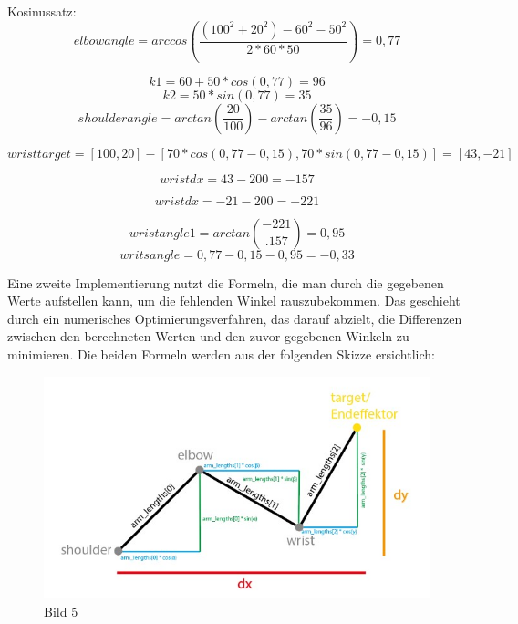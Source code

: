 \documentclass[12pt]{article}
\begin{document}
    Kosinussatz:
    \[
        elbowangle = arccos(\frac{(100^2 +20^2)-60^2-50^2}{2*60*50}) = 0,77
    \]

    

    \[
        k1 = 60 +50 * cos(0,77) = 96
    \]
    \[
        k2 = 50*sin(0,77) = 35
    \]
    \[
        shoulderangle = arctan(\frac{20}{100}) - arctan(\frac{35}{96}) = -0,15
    \]

    

    \[
        wristtarget = [100, 20] - [70 * cos(0,77 - 0,15), 70* sin(0,77 -0,15)] = [43, -21]
    \]

    \[
        wristdx = 43 - 200 = -157
    \]

    \[
        wristdx = -21 - 200 = -221
    \]

    \[
        wristangle1 = arctan(\frac{-221}{.157})= 0,95
    \]
    \[
        writsangle = 0,77 -0,15 -0,95 = -0,33
    \]

    

    Eine zweite Implementierung nutzt die Formeln, die man durch die gegebenen Werte aufstellen kann, um die fehlenden
    Winkel rauszubekommen. Das geschieht durch ein numerisches Optimierungsverfahren, das darauf abzielt, die Differenzen
    zwischen den berechneten Werten und den zuvor gegebenen Winkeln zu minimieren.
    Die beiden Formeln werden aus der folgenden Skizze ersichtlich:

    \begin{figure}[h]
        \centering
        \includegraphics[width = \linewidth]{Bild 5}
        \caption{Bild 5}
    \end{figure}
\end{document}
